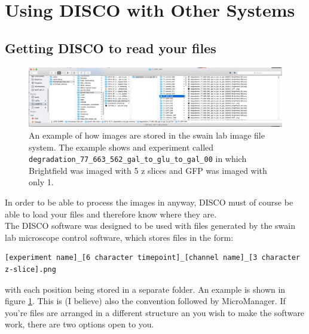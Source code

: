 \section{Using DISCO with Other Systems}

\subsection{Getting DISCO to read your files}
\begin{figure}
	\centering
	\includegraphics[width=1\linewidth]{documentation_images/other_systems-swain_file_structure}
	\caption[swain lab image file system]{An example of how images are stored in the swain lab image file system. The example shows and experiment called \texttt{degradation\_77\_663\_562\_gal\_to\_glu\_to\_gal\_00} in which Brightfield was imaged with 5 z slices and GFP was imaged with only 1. }
	\label{fig:other_systems-swain_file_structure}
\end{figure}
In order to be able to process the images in anyway, DISCO must of course be able to load your files and therefore know where they are.\\
The DISCO software was designed to be used with files generated by the swain lab microscope control software, which stores files in the form:
\begin{verbatim}
[experiment name]_[6 character timepoint]_[channel name]_[3 character z-slice].png
\end{verbatim}
with each position being stored in a separate folder. An example is shown in figure \ref{fig:other_systems-swain_file_structure}. This is (I believe) also the convention followed by MicroManager. If you're files are arranged in a different structure an you wish to make the software work, there are two options open to you.

